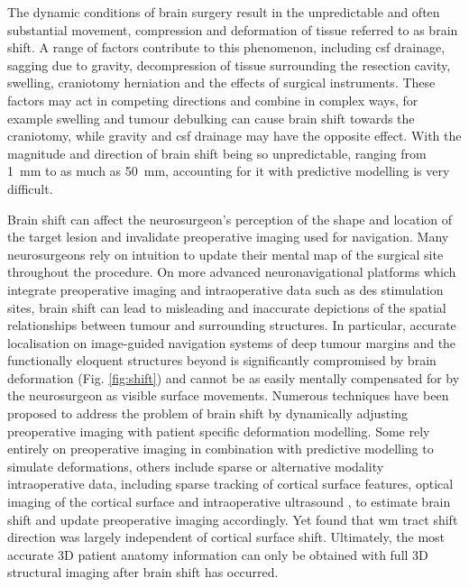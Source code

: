 \documentclass[12pt,phd,a4paper,twoside]{ucl_thesis}
\renewcommand{\textcite}[2][]{
\ifthenelse { \equal {#1} {} }  {\citeauthor{#2}\autocite{#2}}   {\citeauthor{#1}\autocite{#2}}}
\begin{document}
The dynamic conditions of brain surgery result in the unpredictable and often substantial movement, compression and deformation of tissue referred to as brain shift.
A range of factors contribute to this phenomenon, including \gls{csf} drainage, sagging due to gravity, decompression of tissue surrounding the resection cavity, swelling, craniotomy herniation and the effects of surgical instruments\autocite{Gerard2017}.
These factors may act in competing directions and combine in complex ways, for example swelling and tumour debulking can cause brain shift towards the craniotomy, while gravity and \gls{csf} drainage may have the opposite effect\autocite{Roberts1998}.
With the magnitude and direction of brain shift being so unpredictable, ranging from 1~mm to as much as 50~mm\autocite{Gerard2017}, accounting for it with predictive modelling is very difficult\autocite{Bayer2017b}.

Brain shift can affect the neurosurgeon's perception of the shape and location of the target lesion and invalidate preoperative imaging used for navigation\autocite{Nimsky2000}.
Many neurosurgeons rely on intuition to update their mental map of the surgical site throughout the procedure.
On more advanced neuronavigational platforms which integrate preoperative imaging and intraoperative data such as \gls{des} stimulation sites, brain shift can lead to misleading and inaccurate depictions of the spatial relationships between tumour and surrounding structures.
In particular, accurate localisation on image-guided navigation systems of deep tumour margins and the functionally eloquent structures beyond is significantly compromised by brain deformation (Fig. \ref{fig:shift}) and cannot be as easily mentally compensated for by the neurosurgeon as visible surface movements\autocite{Nimsky2000}.
Numerous techniques have been proposed to address the problem of brain shift\autocite{Bayer2017b} by dynamically adjusting preoperative imaging with patient specific deformation modelling.
Some rely entirely on preoperative imaging in combination with predictive modelling to simulate deformations, others include sparse or alternative modality intraoperative data, including sparse tracking of cortical surface features\autocite{Luo2019}, optical imaging of the cortical surface\autocite{Skrinjar2002,Audette2005,Fan2017} and intraoperative ultrasound \autocite{Letteboer2005,Reinertsen2007,Bucki2012,Machado2019}, to estimate brain shift and update preoperative imaging accordingly.
Yet \textcite{Yang2017a} found that \gls{wm} tract shift direction was largely independent of cortical surface shift.
Ultimately, the most accurate 3D patient anatomy information can only be obtained with full 3D structural imaging after brain shift has occurred.
\end{document}
